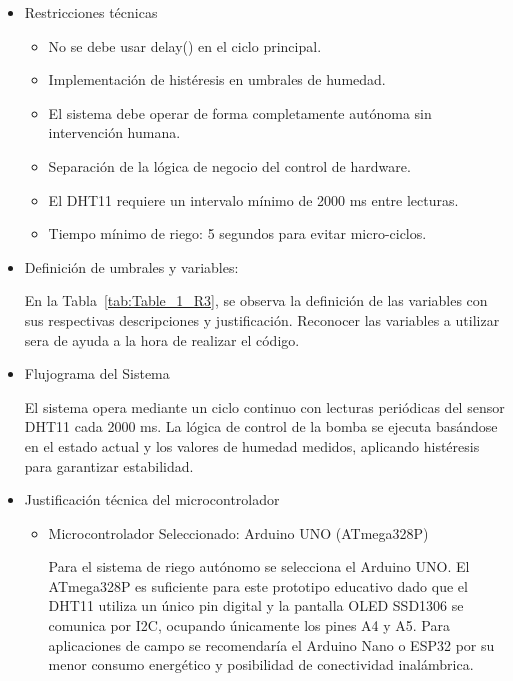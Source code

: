 \begin{itemize}
        \item Restricciones técnicas
            \begin{itemize}
                \item No se debe usar delay() en el ciclo principal.
                \item Implementación de histéresis en umbrales de humedad.
                \item El sistema debe operar de forma completamente autónoma sin intervención humana.
                \item Separación de la lógica de negocio del control de hardware.
                \item El DHT11 requiere un intervalo mínimo de 2000 ms entre lecturas.
                \item Tiempo mínimo de riego: 5 segundos para evitar micro-ciclos.
                
            \end{itemize}

        \item Definición de umbrales y variables:

        En la Tabla~\ref{tab:Table_1_R3}, se observa la definición de las variables con sus respectivas descripciones y justificación. Reconocer las variables a utilizar sera de ayuda a la hora de realizar el código.

        

        \item Flujograma del Sistema

        El sistema opera mediante un ciclo continuo con lecturas periódicas del sensor DHT11 cada 2000 ms. La lógica de control de la bomba se ejecuta basándose en el estado actual y los valores de humedad medidos, aplicando histéresis para garantizar estabilidad.

        

        \item Justificación técnica del microcontrolador
            \begin{itemize}
                \item Microcontrolador Seleccionado: Arduino UNO (ATmega328P)
    
                Para el sistema de riego autónomo se selecciona el Arduino UNO. El ATmega328P es suficiente para este prototipo educativo dado que el DHT11 utiliza un único pin digital y la pantalla OLED SSD1306 se comunica por I2C, ocupando únicamente los pines A4 y A5. Para aplicaciones de campo se recomendaría el Arduino Nano o ESP32 por su menor consumo energético y posibilidad de conectividad inalámbrica.
    

\end{itemize}
\end{itemize}
